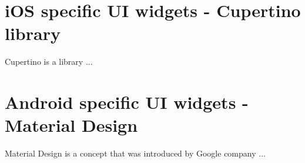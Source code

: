 



\section{iOS specific UI widgets - Cupertino library}\label{sec:ios-specific-ui-widgets}
Cupertino is a library ...%


\section{Android specific UI widgets - Material Design}\label{sec:android-specific-ui-widgets}
Material Design is a concept that was introduced by Google company ...%
